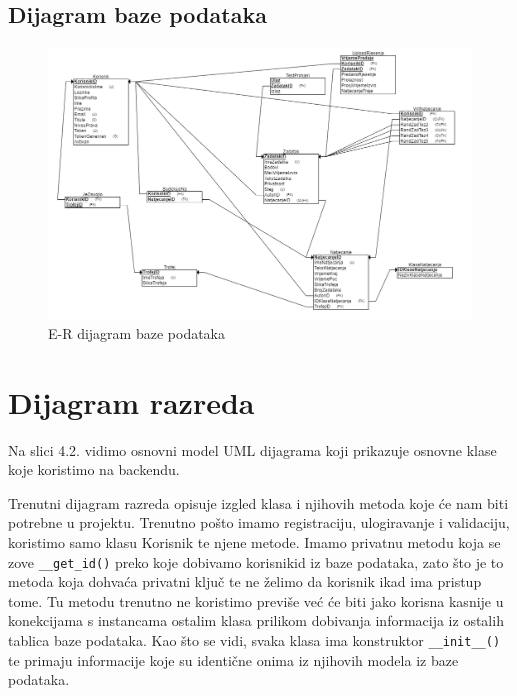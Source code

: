 		
		
		\subsection{Dijagram baze podataka}
		\begin{figure}[H]
			\includegraphics[width=\textwidth]{slike/RelacijskaShema.PNG} %
			\caption{E-R dijagram baze podataka}
			\label{fig:RelacijskaShema} %
		\end{figure}
		
		\eject
			
			
		\section{Dijagram razreda}
			Na slici 4.2. vidimo osnovni model UML dijagrama koji prikazuje osnovne klase koje koristimo na backendu.
				
			Trenutni dijagram razreda opisuje izgled klasa i njihovih metoda koje će nam biti potrebne u projektu. 
			Trenutno pošto imamo registraciju, ulogiravanje i validaciju, koristimo samo klasu Korisnik te njene metode. 
			Imamo privatnu metodu koja se zove \verb*|__get_id()| preko koje dobivamo korisnikid iz baze podataka,
			zato što je to metoda koja dohvaća privatni ključ te ne želimo da korisnik ikad ima pristup tome.
			Tu metodu trenutno ne koristimo previše već će biti jako korisna kasnije u konekcijama s instancama ostalim
			klasa prilikom dobivanja informacija iz ostalih tablica baze podataka. Kao što se vidi, svaka klasa ima 
			konstruktor \verb*|__init__()| te primaju informacije koje su identične onima iz njihovih modela iz baze podataka.

